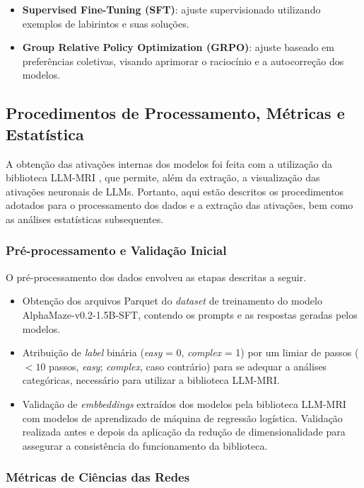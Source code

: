 \begin{itemize}
    \item \textbf{Supervised Fine-Tuning (SFT)}: ajuste supervisionado utilizando exemplos de labirintos e suas soluções.
    \item \textbf{Group Relative Policy Optimization (GRPO)}: ajuste baseado em preferências coletivas, visando aprimorar o raciocínio e a autocorreção dos modelos.
\end{itemize}

\subsection{Procedimentos de Processamento, Métricas e Estatística}

A obtenção das ativações internas dos modelos foi feita com a utilização da biblioteca LLM-MRI \cite{costa2024llmmri}, que permite, além da extração, a visualização das ativações neuronais de LLMs. Portanto, aqui estão descritos os procedimentos adotados para o processamento dos dados e a extração das ativações, bem como as análises estatísticas subsequentes.

\subsubsection{Pré-processamento e Validação Inicial}

O pré-processamento dos dados envolveu as etapas descritas a seguir.
\begin{itemize}
    \item Obtenção dos arquivos Parquet do \textit{dataset} de treinamento do modelo AlphaMaze-v0.2-1.5B-SFT, contendo os prompts e as respostas geradas pelos modelos.
    \item Atribuição de \textit{label} binária (\textit{easy} = 0, \textit{complex} = 1) por um limiar de passos ($<10$ passos, \textit{easy}; \textit{complex}, caso contrário) para se adequar a análises categóricas, necessário para utilizar a biblioteca LLM-MRI.
    \item Validação de \textit{embbeddings} extraídos dos modelos pela biblioteca LLM-MRI com modelos de aprendizado de máquina de regressão logística. Validação realizada antes e depois da aplicação da redução de dimensionalidade para assegurar a consistência do funcionamento da biblioteca.
\end{itemize}

\subsubsection{Métricas de Ciências das Redes}\label{sec:metodologia-metricas}

